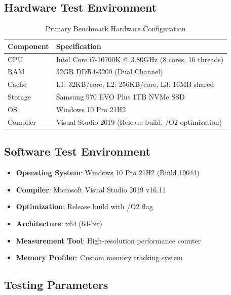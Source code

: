 \documentclass[12pt,a4paper]{article}
\begin{document}
\subsection{Hardware Test Environment}

\begin{table}[h]
\centering
\caption{Primary Benchmark Hardware Configuration}
\begin{tabular}{|l|l|}
\hline
\textbf{Component} & \textbf{Specification} \\
\hline
CPU & Intel Core i7-10700K @ 3.80GHz (8 cores, 16 threads) \\
RAM & 32GB DDR4-3200 (Dual Channel) \\
Cache & L1: 32KB/core, L2: 256KB/core, L3: 16MB shared \\
Storage & Samsung 970 EVO Plus 1TB NVMe SSD \\
OS & Windows 10 Pro 21H2 \\
Compiler & Visual Studio 2019 (Release build, /O2 optimization) \\
\hline
\end{tabular}
\end{table}

\subsection{Software Test Environment}

\begin{itemize}
    \item \textbf{Operating System}: Windows 10 Pro 21H2 (Build 19044)
    \item \textbf{Compiler}: Microsoft Visual Studio 2019 v16.11
    \item \textbf{Optimization}: Release build with /O2 flag
    \item \textbf{Architecture}: x64 (64-bit)
    \item \textbf{Measurement Tool}: High-resolution performance counter
    \item \textbf{Memory Profiler}: Custom memory tracking system
\end{itemize}

\subsection{Testing Parameters}
\end{document}
